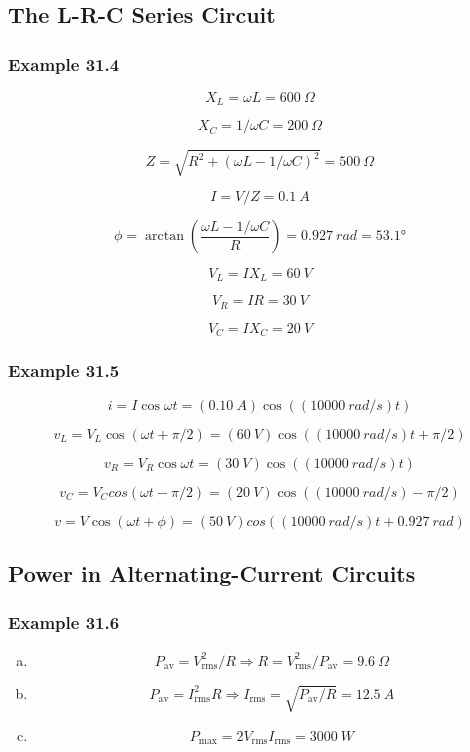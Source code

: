 \documentclass{article}
\begin{document}
\subsection{The L-R-C Series Circuit}

\subsubsection{Example 31.4}

\[X_L = \omega L = \qty{600}{\Omega}\]

\[X_C = 1 / \omega C = \qty{200}{\Omega}\]

\[Z = \sqrt{R^2 + (\omega L - 1 / \omega C)^2} = \qty{500}{\Omega}\]

\[I = V / Z = \qty{0.1}{A}\]

\[\phi = \arctan \left( \frac{\omega L - 1 / \omega C}{R} \right) = \qty{0.927}{rad} = \ang{53.1}\]

\[V_L = I X_L = \qty{60}{V}\]

\[V_R = I R = \qty{30}{V}\]

\[V_C = I X_C = \qty{20}{V}\]

\subsubsection{Example 31.5}

\[i = I \cos \omega t = (\qty{0.10}{A}) \cos ((\qty{10000}{rad/s})t)\]

\[v_L = V_L \cos (\omega t + \pi / 2) = (\qty{60}{V}) \cos ((\qty{10000}{rad/s}) t + \pi / 2)\]

\[v_R = V_R \cos \omega t = (\qty{30}{V}) \cos ((\qty{10000}{rad/s}) t)\]

\[v_C = V_C cos (\omega t - \pi / 2) = (\qty{20}{V}) \cos ((\qty{10000}{rad/s}) - \pi / 2)\]

\[v = V \cos (\omega t + \phi) = (\qty{50}{V}) cos ((\qty{10000}{rad/s}) t + \qty{0.927}{rad})\]

\subsection{Power in Alternating-Current Circuits}

\subsubsection{Example 31.6}

\begin{enumerate}[(a)]
  \item \[P_\text{av} = V_\text{rms}^2 / R \Rightarrow R = V_\text{rms}^2 / P_\text{av} = \qty{9.6}{\Omega}\]

  \item \[P_\text{av} = I_\text{rms}^2 R \Rightarrow I_\text{rms} = \sqrt{P_\text{av} / R} = \qty{12.5}{A}\]

  \item \[P_\text{max} = 2 V_\textrm{rms} I_\text{rms} = \qty{3000}{W}\]
\end{enumerate}
\end{document}
